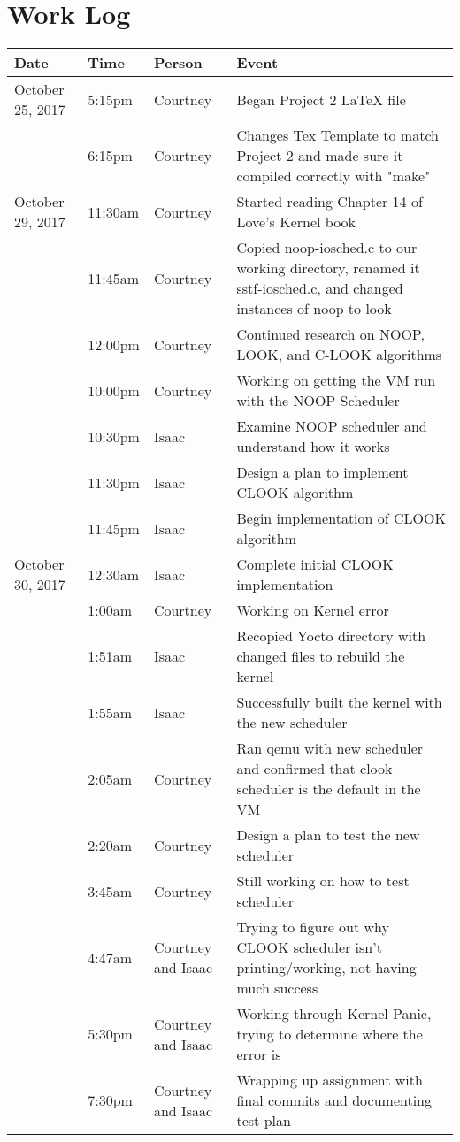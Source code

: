 \documentclass[letterpaper,10pt,draftclsnofoot,onecolumn,titlepage]{IEEEtran}
\begin{document}
\section{Work Log}
\begin{center}
\begin{tabular}{p{3cm}p{1cm}p{1cm}p{10cm} }
 Date  & Time & Person & Event \\ \hline
October 25, 2017 & 5:15pm & Courtney & Began Project 2 LaTeX file \\
		 & 6:15pm & Courtney & Changes Tex Template to match Project 2 and made sure it compiled correctly with "make" \\
October 29, 2017 & 11:30am & Courtney & Started reading Chapter 14 of Love's Kernel book \\                 
		 & 11:45am & Courtney & Copied noop-iosched.c to our working directory, renamed it sstf-iosched.c, and changed instances of noop to look \\ 
		 & 12:00pm & Courtney & Continued research on NOOP, LOOK, and C-LOOK algorithms \\
		 & 10:00pm & Courtney & Working on getting the VM run with the NOOP Scheduler \\
   		 & 10:30pm & Isaac & Examine NOOP scheduler and understand how it works \\
   		 & 11:30pm & Isaac & Design a plan to implement CLOOK algorithm \\
   		 & 11:45pm & Isaac & Begin implementation of CLOOK algorithm \\
October 30, 2017 & 12:30am & Isaac & Complete initial CLOOK implementation \\
		 & 1:00am & Courtney & Working on Kernel error \\
		 & 1:51am & Isaac & Recopied Yocto directory with changed files to rebuild the kernel \\
		 & 1:55am & Isaac & Successfully built the kernel with the new scheduler \\
		 & 2:05am & Courtney & Ran qemu with new scheduler and confirmed that clook scheduler is the default in the VM \\
   		 & 2:20am & Courtney & Design a plan to test the new scheduler \\
		 & 3:45am & Courtney & Still working on how to test scheduler \\
		 & 4:47am & Courtney and Isaac & Trying to figure out why CLOOK scheduler isn't printing/working, not having much success \\
		 & 5:30pm & Courtney and Isaac & Working through Kernel Panic, trying to determine where the error is \\
   		 & 7:30pm & Courtney and Isaac & Wrapping up assignment with final commits and documenting test plan \\
\end{tabular}
\end{center}
\end{document}
